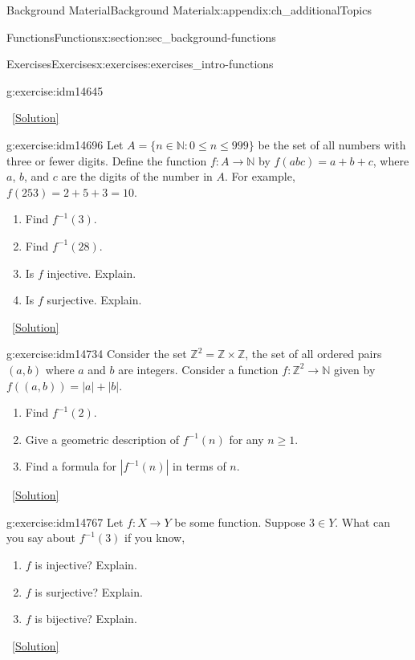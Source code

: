 \documentclass[oneside,10pt,]{book}
\numberwithin{equation}{chapter}
\def\N{\mathbb N}
\def\Z{\mathbb Z}
\def\inv{^{-1}}
\def\st{:}
\begin{document}
\begin{appendixptx}{Background Material}{}{Background Material}{}{}{x:appendix:ch_additionalTopics}
\begin{sectionptx}{Functions}{}{Functions}{}{}{x:section:sec_background-functions}
\begin{exercises-subsection}{Exercises}{}{Exercises}{}{}{x:exercises:exercises_intro-functions}
\begin{divisionexercise}{6}{}{}{g:exercise:idm14645}
\begin{enumerate}[label=(\alph*)]
\end{enumerate}
%
\qquad~\hfill{\tiny\hyperlink{g:solution:idm14669-main}{[Solution]}}\end{divisionexercise}%
\begin{divisionexercise}{7}{}{}{g:exercise:idm14696}%
Let \(A = \{n \in \N \st 0 \le n \le 999\}\) be the set of all numbers with three or fewer digits. Define the function \(f:A \to \N\) by \(f(abc) = a+b+c\), where \(a\), \(b\), and \(c\) are the digits of the number in \(A\). For example, \(f(253) = 2 + 5 + 3 =  10\).%
\begin{enumerate}[label=(\alph*)]
\item{}Find \(f\inv(3)\).%
\item{}Find \(f\inv(28)\).%
\item{}Is \(f\) injective. Explain.%
\item{}Is \(f\) surjective. Explain.%
\end{enumerate}
%
\qquad~\hfill{\tiny\hyperlink{g:solution:idm14720-main}{[Solution]}}\end{divisionexercise}%
\begin{divisionexercise}{8}{}{}{g:exercise:idm14734}%
Consider the set \(\Z^2 = \Z \times \Z\), the set of all ordered pairs \((a,b)\) where \(a\) and \(b\) are integers.  Consider a function \(f: \Z^2 \to \N\) given by \(f((a,b)) = |a| + |b|\).%
\begin{enumerate}[label=(\alph*)]
\item{}Find \(f\inv(2)\).%
\item{}Give a geometric description of \(f\inv(n)\) for any \(n \ge 1\).%
\item{}Find a formula for \(|f\inv(n)|\) in terms of \(n\).%
\end{enumerate}
%
\qquad~\hfill{\tiny\hyperlink{g:solution:idm14755-main}{[Solution]}}\end{divisionexercise}%
\begin{divisionexercise}{9}{}{}{g:exercise:idm14767}%
Let \(f:X \to Y\) be some function. Suppose \(3 \in Y\). What can you say about \(f\inv(3)\) if you know,%
\begin{enumerate}[label=(\alph*)]
\item{}\(f\) is injective? Explain.%
\item{}\(f\) is surjective? Explain.%
\item{}\(f\) is bijective? Explain.%
\end{enumerate}
%
\qquad~\hfill{\tiny\hyperlink{g:solution:idm14783-main}{[Solution]}}\end{divisionexercise}%

\end{exercises-subsection}
\end{sectionptx}
\end{appendixptx}
\end{document}

